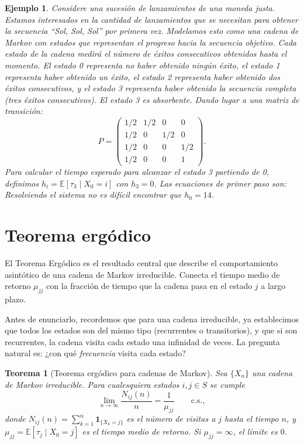 \documentclass[12pt]{book}
\newtheorem{theorem}{Teorema}[chapter]
\newtheorem{example}{Ejemplo}[chapter]
\begin{document}
\begin{example}
    Considere una sucesión de lanzamientos de una moneda justa. Estamos interesados en la cantidad de lanzamientos que se necesitan para obtener la secuencia ``Sol, Sol, Sol'' por primera vez. Modelamos esto como una cadena de Markov con estados que representan el progreso hacia la secuencia objetivo. Cada estado de la cadena medirá el número de éxitos consecutivos obtenidos hasta el momento. El estado 0 representa no haber obtenido ningún éxito, el estado 1 representa haber obtenido un éxito, el estado 2 representa haber obtenido dos éxitos consecutivos, y el estado 3 representa haber obtenido la secuencia completa (tres éxitos consecutivos). El estado 3 es absorbente.
    Dando lugar a una matriz de transición:
    \[
    P = \begin{pmatrix}
    1/2 & 1/2 & 0   & 0 \\
    1/2  & 0 & 1/2 & 0 \\
    1/2   & 0   & 0 & 1/2 \\
    1/2   & 0   & 0   & 1
    \end{pmatrix}.
    \]
    Para calcular el tiempo esperado para alcanzar el estado 3 partiendo de 0, definimos $h_i = \mathbb{E}[\tau_3 \mid X_0 = i]$ con $h_3 = 0$. Las ecuaciones de primer paso son:
    Resolviendo el sistema no es difícil encontrar que $h_0=14$.
\end{example}

\section{Teorema ergódico}

El Teorema Ergódico es el resultado central que describe el comportamiento asintótico de una cadena de Markov irreducible. Conecta el tiempo medio de retorno $\mu_{jj}$ con la fracción de tiempo que la cadena pasa en el estado $j$ a largo plazo.

Antes de enunciarlo, recordemos que para una cadena irreducible, ya establecimos que todos los estados son del mismo tipo (recurrentes o transitorios), y que si son recurrentes, la cadena visita cada estado una infinidad de veces. La pregunta natural es: ¿con qué \emph{frecuencia} visita cada estado?

\begin{theorem}[Teorema ergódico para cadenas de Markov]
Sea $\{X_n\}$ una cadena de Markov irreducible. Para cualesquiera estados $i, j \in S$ se cumple
\[
\lim_{n \to \infty} \frac{N_{ij}(n)}{n} = \frac{1}{\mu_{jj}} \qquad \text{c.s.},
\]
donde $N_{ij}(n) = \sum_{k=1}^{n} \mathbf{1}_{\{X_k = j\}}$ es el número de visitas a $j$ hasta el tiempo $n$, y $\mu_{jj} = \mathbb{E}[\tau_j \mid X_0 = j]$ es el tiempo medio de retorno. Si $\mu_{jj} = \infty$, el límite es $0$.
\end{theorem}
\end{document}
